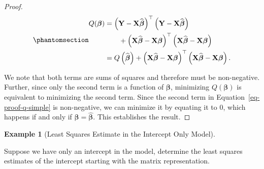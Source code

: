 \documentclass[
  letterpaper,
  DIV=11,
  numbers=noendperiod]{scrreprt}
\theoremstyle{definition}
\theoremstyle{plain}
\theoremstyle{definition}
\newtheorem{example}{Example}[chapter]
\theoremstyle{remark}
\begin{document}
\begin{proof}
\begin{equation}\phantomsection\label{eq-proof-q-simple}{
\begin{aligned}
  Q(\boldsymbol{\beta})
    &= \left(\mathbf{Y} - \mathbf{X}\widehat{\boldsymbol{\beta}}\right)^\top \left(\mathbf{Y} - \mathbf{X}\widehat{\boldsymbol{\beta}}\right) \\
    &\qquad + \left(\mathbf{X}\widehat{\boldsymbol{\beta}} - \mathbf{X}\boldsymbol{\beta}\right)^\top \left(\mathbf{X}\widehat{\boldsymbol{\beta}} - \mathbf{X}\boldsymbol{\beta}\right) \\
    &= Q\left(\widehat{\boldsymbol{\beta}}\right) + \left(\mathbf{X}\widehat{\boldsymbol{\beta}} - \mathbf{X}\boldsymbol{\beta}\right)^\top \left(\mathbf{X}\widehat{\boldsymbol{\beta}} - \mathbf{X}\boldsymbol{\beta}\right).
\end{aligned}
}\end{equation}

We note that both terms are sums of squares and therefore must be
non-negative. Further, since only the second term is a function of
\(\boldsymbol{\beta}\), minimizing \(Q(\boldsymbol{\beta})\) is
equivalent to minimizing the second term. Since the second term in
Equation~\ref{eq-proof-q-simple} is non-negative, we can minimize it by
equating it to 0, which happens if and only if
\(\boldsymbol{\beta} = \widehat{\boldsymbol{\beta}}\). This establishes
the result.
\end{proof}

\begin{example}[Least Squares Estimate in the Intercept Only
Model]\protect\hypertarget{exm-special-case}{}\label{exm-special-case}

Suppose we have only an intercept in the model, determine the least
squares estimates of the intercept starting with the matrix
representation.

\end{example}
\end{document}

